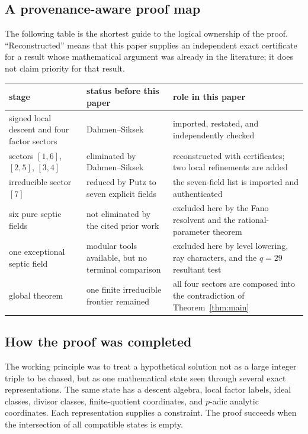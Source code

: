 \documentclass[11pt]{article}
\theoremstyle{definition}
\theoremstyle{remark}
\begin{document}
\subsection{A provenance-aware proof map}

The following table is the shortest guide to the logical ownership of the
proof.  ``Reconstructed'' means that this paper supplies an independent
exact certificate for a result whose mathematical argument was already in
the literature; it does not claim priority for that result.

\begin{center}
\small
\renewcommand{\arraystretch}{1.18}
\begin{tabular}{@{}>{\raggedright\arraybackslash}p{}
                    >{\raggedright\arraybackslash}p{}
                    >{\raggedright\arraybackslash}p{}@{}}
\toprule
stage & status before this paper & role in this paper\\
\midrule
signed local descent and four factor sectors
 & Dahmen--Siksek
 & imported, restated, and independently checked\\
sectors $[1,6]$, $[2,5]$, $[3,4]$
 & eliminated by Dahmen--Siksek
 & reconstructed with certificates; two local refinements are added\\
irreducible sector $[7]$
 & reduced by Putz to seven explicit fields
 & the seven-field list is imported and authenticated\\
six pure septic fields
 & not eliminated by the cited prior work
 & excluded here by the Fano resolvent and the rational-parameter theorem\\
one exceptional septic field
 & modular tools available, but no terminal comparison
 & excluded here by level lowering, ray characters, and the $q=29$ resultant test\\
global theorem
 & one finite irreducible frontier remained
 & all four sectors are composed into the contradiction of Theorem~\ref{thm:main}\\
\bottomrule
\end{tabular}
\normalsize
\end{center}

\subsection{How the proof was completed}

The working principle was to treat a hypothetical solution not as a large
integer triple to be chased, but as one mathematical state seen through
several exact representations.  The same state has a descent algebra, local
factor labels, ideal classes, divisor classes, finite-quotient coordinates,
and $p$-adic analytic coordinates.  Each representation supplies a
constraint.  The proof succeeds when the intersection of all compatible
states is empty.
\end{document}
